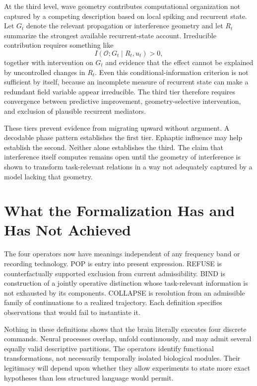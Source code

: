 \documentclass[11pt]{book}
\begin{document}
At the third level, wave geometry contributes computational organization not captured by a competing description based on local spiking and recurrent state. Let $G_t$ denote the relevant propagation or interference geometry and let $R_t$ summarize the strongest available recurrent-state account. Irreducible contribution requires something like
\[
I(\mathcal O;G_t\mid R_t,u_t)>0,
\]
together with intervention on $G_t$ and evidence that the effect cannot be explained by uncontrolled changes in $R_t$. Even this conditional-information criterion is not sufficient by itself, because an incomplete measure of recurrent state can make a redundant field variable appear irreducible. The third tier therefore requires convergence between predictive improvement, geometry-selective intervention, and exclusion of plausible recurrent mediators.

These tiers prevent evidence from migrating upward without argument. A decodable phase pattern establishes the first tier. Ephaptic influence may help establish the second. Neither alone establishes the third. The claim that interference itself computes remains open until the geometry of interference is shown to transform task-relevant relations in a way not adequately captured by a model lacking that geometry.

\section*{What the Formalization Has and Has Not Achieved}

The four operators now have meanings independent of any frequency band or recording technology. POP is entry into present expression. REFUSE is counterfactually supported exclusion from current admissibility. BIND is construction of a jointly operative distinction whose task-relevant information is not exhausted by its components. COLLAPSE is resolution from an admissible family of continuations to a realized trajectory. Each definition specifies observations that would fail to instantiate it.

Nothing in these definitions shows that the brain literally executes four discrete commands. Neural processes overlap, unfold continuously, and may admit several equally valid descriptive partitions. The operators identify functional transformations, not necessarily temporally isolated biological modules. Their legitimacy will depend upon whether they allow experiments to state more exact hypotheses than less structured language would permit.
\end{document}
